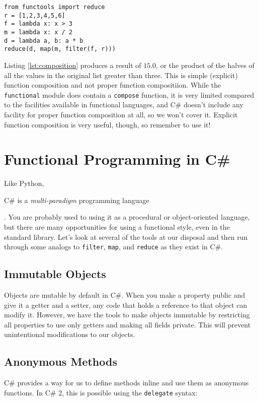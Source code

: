 \documentclass{article}\usepackage{beamerarticle}
\begin{document}
\begin{frame}[fragile]
\begin{lstlisting}[style=python,caption={Function Composition},label={lst:composition}]
from functools import reduce
r = [1,2,3,4,5,6]
f = lambda x: x > 3
m = lambda x: x / 2
d = lambda a, b: a * b
reduce(d, map(m, filter(f, r)))
\end{lstlisting}
\end{frame}

\noindent Listing \ref{lst:composition} produces a result of $15.0$, or the product of the halves of all the values in the original list greater than three. This is simple (explicit) function composition and not proper function compositiion. While the \texttt{functional} module does contain a \texttt{compose} function, it is very limited compared to the facilities available in functional languages, and C\# doesn't include any facility for proper function composition at all, so we won't cover it. Explicit function composition is very useful, though, so remember to use it!

\section{Functional Programming in C\#}
Like Python,%
\begin{frame}
C\# is a \textit{multi-paradigm} programming language%
\end{frame}.
You are probably used to using it as a procedural or object-oriented language, but there are many opportunities for using a functional style, even in the standard library. Let's look at several of the tools at our disposal and then run through some analogs to \texttt{filter}, \texttt{map}, and \texttt{reduce} as they exist in C\#.

\subsection{Immutable Objects}
Objects are mutable by default in C\#. When you make a property public and give it a getter and a setter, any code that holds a reference to that object can modify it. However, we have the tools to make objects immutable by restricting all properties to use only getters and making all fields private. This will prevent unintentional modifications to our objects.

\subsection{Anonymous Methods}
C\# provides a way for us to define methods inline and use them as anonymous functions. In C\# 2, this is possible using the \texttt{delegate} syntax:
\end{document}
